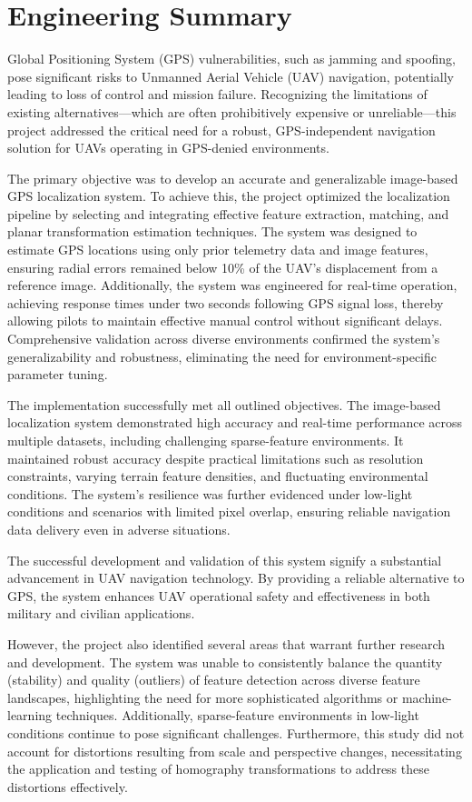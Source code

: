 \section{Engineering Summary}

Global Positioning System (GPS) vulnerabilities, such as jamming and spoofing, pose significant risks to Unmanned Aerial Vehicle (UAV) navigation, potentially leading to loss of control and mission failure. Recognizing the limitations of existing alternatives—which are often prohibitively expensive or unreliable—this project addressed the critical need for a robust, GPS-independent navigation solution for UAVs operating in GPS-denied environments.

The primary objective was to develop an accurate and generalizable image-based GPS localization system. To achieve this, the project optimized the localization pipeline by selecting and integrating effective feature extraction, matching, and planar transformation estimation techniques. The system was designed to estimate GPS locations using only prior telemetry data and image features, ensuring radial errors remained below 10\% of the UAV's displacement from a reference image. Additionally, the system was engineered for real-time operation, achieving response times under two seconds following GPS signal loss, thereby allowing pilots to maintain effective manual control without significant delays. Comprehensive validation across diverse environments confirmed the system's generalizability and robustness, eliminating the need for environment-specific parameter tuning.

The implementation successfully met all outlined objectives. The image-based localization system demonstrated high accuracy and real-time performance across multiple datasets, including challenging sparse-feature environments. It maintained robust accuracy despite practical limitations such as resolution constraints, varying terrain feature densities, and fluctuating environmental conditions. The system's resilience was further evidenced under low-light conditions and scenarios with limited pixel overlap, ensuring reliable navigation data delivery even in adverse situations.

The successful development and validation of this system signify a substantial advancement in UAV navigation technology. By providing a reliable alternative to GPS, the system enhances UAV operational safety and effectiveness in both military and civilian applications. 

However, the project also identified several areas that warrant further research and development. The system was unable to consistently balance the quantity (stability) and quality (outliers) of feature detection across diverse feature landscapes, highlighting the need for more sophisticated algorithms or machine-learning techniques. Additionally, sparse-feature environments in low-light conditions continue to pose significant challenges. Furthermore, this study did not account for distortions resulting from scale and perspective changes, necessitating the application and testing of homography transformations to address these distortions effectively.


